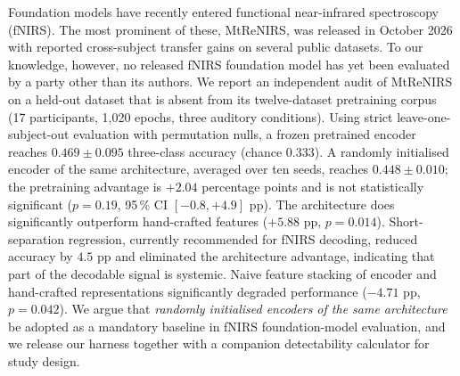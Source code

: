 Foundation models have recently entered functional near-infrared spectroscopy (fNIRS).
The most prominent of these, MtReNIRS, was released in October 2026 with reported cross-subject
transfer gains on several public datasets. To our knowledge, however, no released fNIRS
foundation model has yet been evaluated by a party other than its authors. We report an independent audit of MtReNIRS on a held-out dataset
that is absent from its twelve-dataset pretraining corpus (17 participants, 1{,}020 epochs,
three auditory conditions). Using strict leave-one-subject-out evaluation with permutation
nulls, a frozen pretrained encoder reaches $0.469 \pm 0.095$ three-class accuracy (chance
$0.333$). A randomly initialised encoder of the same architecture, averaged over ten seeds,
reaches $0.448 \pm 0.010$; the pretraining advantage is $+2.04$ percentage points and is not
statistically significant ($p = 0.19$, 95\,\% CI $[-0.8, +4.9]$ pp). The architecture does
significantly outperform hand-crafted features ($+5.88$ pp, $p = 0.014$). Short-separation
regression, currently recommended for fNIRS decoding, reduced accuracy by $4.5$ pp and
eliminated the architecture advantage, indicating that part of the decodable signal is
systemic. Naive feature stacking of encoder and hand-crafted representations significantly
degraded performance ($-4.71$ pp, $p = 0.042$). We argue that \emph{randomly initialised
encoders of the same architecture} be adopted as a mandatory baseline in fNIRS foundation-model
evaluation, and we release our harness together with a companion detectability calculator for
study design.
